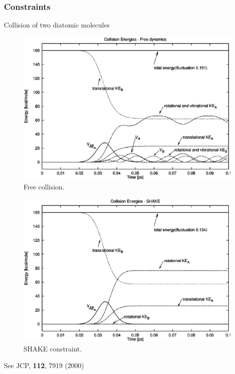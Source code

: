 \documentclass{beamer}
\begin{document}
\begin{frame}\frametitle{Constraints}

Collision of two diatomic molecules
\begin{minipage}[t]{0.48\linewidth}
\begin{figure}
\includegraphics[scale=0.18]{collision.eps}
\caption{{\scriptsize  Free collision.}}
\end{figure}

\end{minipage}
\hfill%
\begin{minipage}[t]{0.48\linewidth}
\begin{figure}
\includegraphics[scale=0.18]{collision_shake.eps}
\caption{{\scriptsize  SHAKE constraint.}}

\end{figure}
\end{minipage}
See JCP, {\bf 112}, 7919 (2000)
\end{frame}
\end{document}
